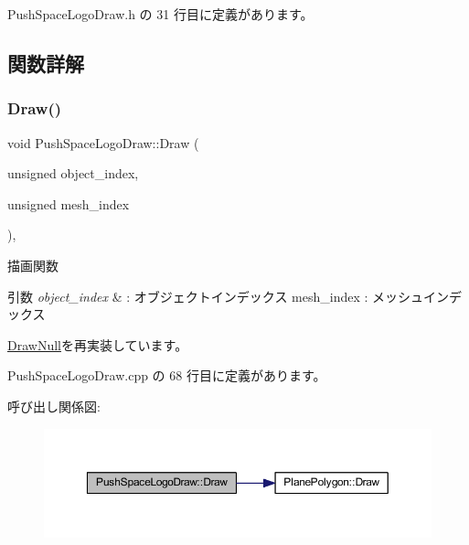  Push\+Space\+Logo\+Draw.\+h の 31 行目に定義があります。



\subsection{関数詳解}
\mbox{\label{class_push_space_logo_draw_a647dddefc43d66cb3c720ee8fbb6a783}} 
\subsubsection{\texorpdfstring{Draw()}{Draw()}}
{\footnotesize\ttfamily void Push\+Space\+Logo\+Draw\+::\+Draw (\begin{DoxyParamCaption}\item[{unsigned}]{object\+\_\+index,  }\item[{unsigned}]{mesh\+\_\+index }\end{DoxyParamCaption})\hspace{0.3cm}{\ttfamily [override]}, {\ttfamily [virtual]}}



描画関数 


\begin{DoxyParams}{引数}
{\em object\+\_\+index} & \+: オブジェクトインデックス mesh\+\_\+index \+: メッシュインデックス \\
\hline
\end{DoxyParams}


\mbox{\hyperlink{class_draw_null_afe50f6fd820b18d673f70f048743f339}{Draw\+Null}}を再実装しています。



 Push\+Space\+Logo\+Draw.\+cpp の 68 行目に定義があります。

呼び出し関係図\+:\nopagebreak
\begin{figure}[H]
\begin{center}
\leavevmode
\includegraphics[width=350pt]{class_push_space_logo_draw_a647dddefc43d66cb3c720ee8fbb6a783_cgraph}
\end{center}
\end{figure}
\mbox{\label{class_push_space_logo_draw_a4990a9f5662af324f2632e8647cbdde4}} 
